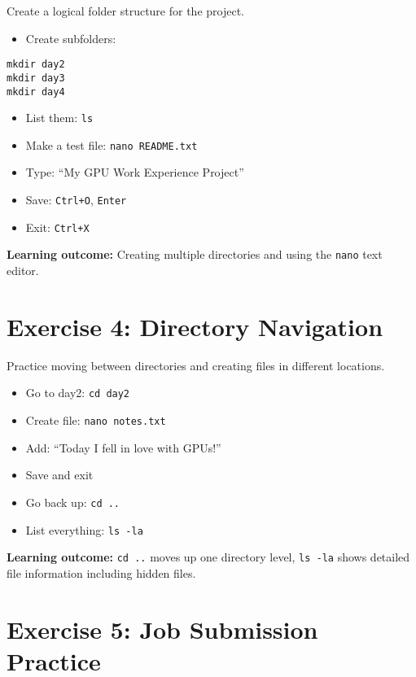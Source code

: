 \documentclass[11pt, a4paper]{article}
\newcommand{\code}[1]{\texttt{#1}}
\begin{document}
Create a logical folder structure for the project.

\begin{itemize}
    \item Create subfolders:
\end{itemize}

\begin{lstlisting}
mkdir day2
mkdir day3
mkdir day4
\end{lstlisting}

\begin{itemize}
    \item List them: \code{ls}
    \item Make a test file: \code{nano README.txt}
    \item Type: \enquote{My GPU Work Experience Project}
    \item Save: \code{Ctrl+O}, \code{Enter}
    \item Exit: \code{Ctrl+X}
\end{itemize}

\textbf{Learning outcome:} Creating multiple directories and using the \code{nano} text editor.

\section*{Exercise 4: Directory Navigation}

Practice moving between directories and creating files in different locations.

\begin{itemize}
    \item Go to day2: \code{cd day2}
    \item Create file: \code{nano notes.txt}
    \item Add: \enquote{Today I fell in love with GPUs!}
    \item Save and exit
    \item Go back up: \code{cd ..}
    \item List everything: \code{ls -la}
\end{itemize}

\textbf{Learning outcome:} \code{cd ..} moves up one directory level, \code{ls -la} shows detailed file information including hidden files.

\section*{Exercise 5: Job Submission Practice}
\end{document}
